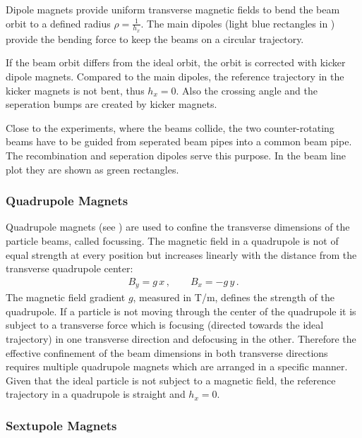 Dipole magnets provide uniform transverse magnetic fields to bend the beam orbit to a defined radius $\rho = \frac{1}{h_x}$. The main dipoles (light blue rectangles in ) provide the bending force to keep the beams on a circular trajectory. 

If the beam orbit differs from the ideal orbit, the orbit is corrected with kicker dipole magnets. Compared to the main dipoles, the reference trajectory in the kicker magnets is not bent, thus $h_x=0$. Also the crossing angle and the seperation bumps are created by kicker magnets.  

Close to the experiments, where the beams collide, the two counter-rotating beams have to be guided from seperated beam pipes into a common beam pipe. The recombination and seperation dipoles serve this purpose. In the beam line plot they are shown as green rectangles.

\subsubsection{Quadrupole Magnets}

Quadrupole magnets (see ) are used to confine the transverse dimensions of the particle beams, called focussing. The magnetic field in a quadrupole is not of equal strength at every position but increases linearly with the distance from the transverse quadrupole center:
\begin{align}
B_y = g \, x \, , \quad \quad B_x = - g \, y \, .
\end{align}
The magnetic field gradient $g$, measured in T/m, defines the strength of the quadrupole. If a particle is not moving through the center of the quadrupole it is subject to a transverse force which is focusing (directed towards the ideal trajectory) in one transverse direction and defocusing in the other. Therefore the effective confinement of the beam dimensions in both transverse directions requires multiple quadrupole magnets which are arranged in a specific manner. Given that the ideal particle is not subject to a magnetic field, the reference trajectory in a quadrupole is straight and $h_x=0$. 

\subsubsection{Sextupole Magnets}

